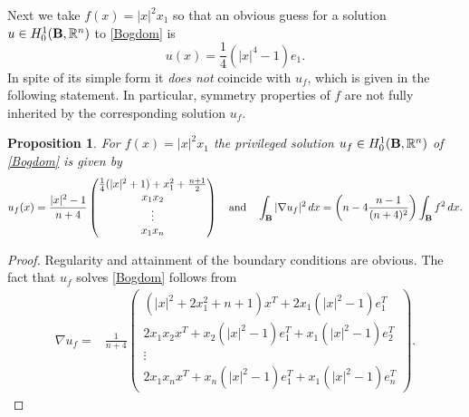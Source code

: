 \documentclass[11pt]{article}
\theoremstyle{plain}
\newtheorem{proposition}[theorem]{Proposition}
\theoremstyle{definition}
\numberwithin{equation}{section}
\newcommand{\R}{\mathbb{R}}
\newcommand{\B}{{\bf B}}
\begin{document}
\begin{appendix}
Next we take $f(x)=|x|^2 x_1$ so that an obvious guess for a  solution $u\in H^1_0(\B,\R^n)$ to \eqref{Bogdom} is
$$
u(x)= \frac14 (|x|^4-1)e_1.%
$$
In spite of its simple form it {\em does not} coincide with $u_f$, which is given in the following statement.
In particular, symmetry properties of $f$ are not fully inherited by the corresponding solution $u_f$.
\begin{proposition}
For $f(x)=|x|^2 x_1$ the privileged solution $u_f\in H^1_0(\B,\R^n)$ of \eqref{Bogdom} is given by
\begin{equation}\label{nablauff}
u_f(x)=
\frac{|x|^2-1}{n+4}\begin{pmatrix}
		\frac14(|x|^2+1)+x_1^2+\frac{n+1}{2}\\
		x_1x_2\\
		\vdots\\
		x_1 x_n
	\end{pmatrix}
\quad\mbox{and}\quad	
\int_\B |\nabla u_f|^2\, dx= \left(n-4\frac{n-1}{(n+4)^2}\right) \int_\B f^2\, dx.
\end{equation}
\end{proposition}
\noindent
\begin{proof} Regularity and attainment of the boundary conditions are obvious. The fact that $u_f$ solves \eqref{Bogdom} follows from
	\begin{align*}
		\nabla u_f =&\frac{1}{n+4}
		\begin{pmatrix}
			\left( |x|^2+2x_1^2+n+1\right) x^T + 2x_1 (|x|^2-1)e_1^T \\
			2x_1x_2 x^T +	x_2 (|x|^2-1)e_1^T + x_1 (|x|^2-1)e_2^T \\
			\vdots \\
			2x_1x_n x^T +	x_n (|x|^2-1)e_1^T + x_1 (|x|^2-1)e_n^T
		\end{pmatrix}.
	\end{align*}
	

\end{proof}
\end{appendix}
\end{document}
